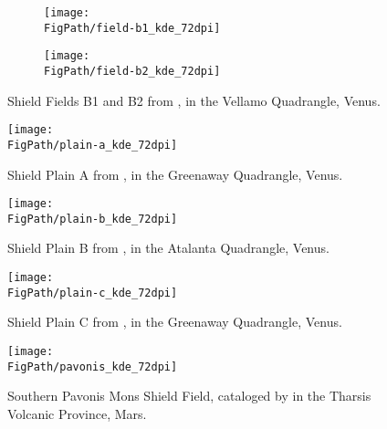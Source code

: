 \begin{figure}[h!]
\centering
\begin{subfigure}{0.49\textwidth}
\centering
\texttt{[image: \\FigPath/field-b1\_kde\_72dpi]}
\end{subfigure}
\begin{subfigure}{0.49\textwidth}
\centering
\texttt{[image: \\FigPath/field-b2\_kde\_72dpi]}
\end{subfigure}
\caption[Shield Fields B1 and B2 from \citet{miller2012shield}, in the Vellamo Quadrangle, Venus]{Shield Fields B1 and B2 from \citet{miller2012shield}, in the Vellamo Quadrangle, Venus.}
\end{figure}

\begin{figure}[h!]
\centering
\texttt{[image: \\FigPath/plain-a\_kde\_72dpi]}
\caption[Shield Plain A from \citet{miller2012shield}, in the Greenaway Quadrangle, Venus]{Shield Plain A from \citet{miller2012shield}, in the Greenaway Quadrangle, Venus.}
\end{figure}

\begin{figure}[h!]
\centering
\texttt{[image: \\FigPath/plain-b\_kde\_72dpi]}
\caption[Shield Plain B from \citet{miller2012shield}, in the Atalanta Quadrangle, Venus]{Shield Plain B from \citet{miller2012shield}, in the Atalanta Quadrangle, Venus.}
\end{figure}

\begin{figure}[h!]
\centering
\texttt{[image: \\FigPath/plain-c\_kde\_72dpi]}
\caption[Shield Plain C from \citet{miller2012shield}, in the Greenaway Quadrangle, Venus]{Shield Plain C from \citet{miller2012shield}, in the Greenaway Quadrangle, Venus.}
\end{figure}

\begin{figure}[h!]
\centering
\texttt{[image: \\FigPath/pavonis\_kde\_72dpi]}
\caption[Southern Pavonis Mons Shield Field, cataloged by \citet{bleacher2009spatial} in the Tharsis Volcanic Province, Mars]{Southern Pavonis Mons Shield Field, cataloged by \citet{bleacher2009spatial} in the Tharsis Volcanic Province, Mars.}
\end{figure}

